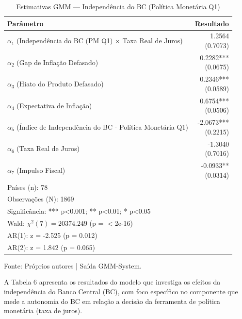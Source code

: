 \documentclass[a4paper,12pt]{article}
\begin{document}
\begin{table}[H]
    \centering
    \caption{Estimativas GMM — Independência do BC (Política Monetária Q1)}
    \label{tab:gmm_monetary_q1_estimates}
    \begin{tabular}{lr} 
        \toprule
        \textbf{Parâmetro} & \textbf{Resultado} \\
        \midrule
        $\alpha_1$ (Independência do BC (PM Q1) $\times$ Taxa Real de Juros) & \makecell[r]{1.2564 \\ (0.7073)} \\
        $\alpha_2$ (Gap de Inflação Defasado) & \makecell[r]{0.2282*** \\ (0.0675)} \\
        $\alpha_3$ (Hiato do Produto Defasado) & \makecell[r]{0.2346*** \\ (0.0589)} \\
        $\alpha_4$ (Expectativa de Inflação) & \makecell[r]{0.6754*** \\ (0.0506)} \\
        $\alpha_5$ (Índice de Independência do BC - Política Monetária Q1) & \makecell[r]{-2.0673*** \\ (0.2215)} \\
        $\alpha_6$ (Taxa Real de Juros) & \makecell[r]{-1.3040 \\ (0.7016)} \\
        $\alpha_7$ (Impulso Fiscal) & \makecell[r]{-0.0933** \\ (0.0314)} \\
        \midrule
        \multicolumn{2}{l}{Países (n): 78} \\
        \multicolumn{2}{l}{Observações (N): 1869} \\
        \multicolumn{2}{l}{Significância: *** p<0.001; ** p<0.01; * p<0.05} \\
        \multicolumn{2}{l}{Wald: $\chi^2(7) = 20374.249$ (p = $<$2e-16)} \\
        \multicolumn{2}{l}{AR(1): z = -2.525 (p = 0.012)} \\
        \multicolumn{2}{l}{AR(2): z = 1.842 (p = 0.065)} \\
        \bottomrule
    \end{tabular}

    \footnotesize{Fonte: Próprios autores | Saída GMM-System}.
\end{table}
A Tabela 6 apresenta os resultados do modelo que investiga os efeitos da independência do Banco Central (BC), com foco específico no componente que mede a autonomia do BC em relação a decisão da ferramenta de política monetária (taxa de juros).
\end{document}
